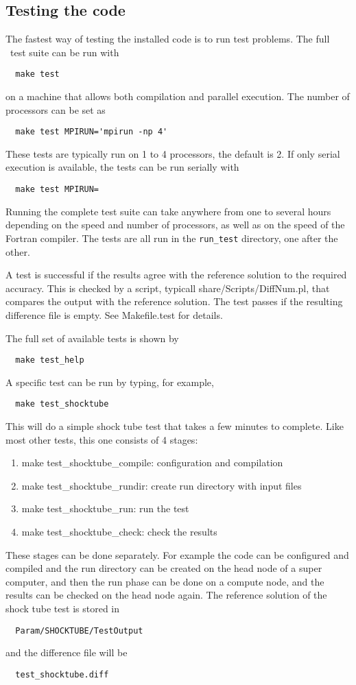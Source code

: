 \subsection{Testing the code}

The fastest way of testing the installed code is to run test problems.
The full \BATSRUS\ test suite can be run with
\begin{verbatim}
  make test
\end{verbatim}
on a machine that allows both compilation and parallel execution. 
The number of processors can be set as
\begin{verbatim}
  make test MPIRUN='mpirun -np 4'
\end{verbatim}
These tests are typically run on 1 to 4 processors, the default is 2.
If only serial execution is available, the tests can be run serially with
\begin{verbatim}
  make test MPIRUN=
\end{verbatim}
Running the complete test suite can take anywhere from one to several
hours depending on the speed and number of processors, as well as on
the speed of the Fortran compiler. The tests are all run in the 
{\tt run\_test} directory, one after the other.

A test is successful if the results agree with the reference solution
to the required accuracy. This is checked by a script, typicall
share/Scripts/DiffNum.pl, that compares the output with the reference
solution.  The test passes if the resulting difference file is empty.
See Makefile.test for details.

The full set of available tests is shown by 
\begin{verbatim}
  make test_help
\end{verbatim}
A specific test can be run by typing, for example,
\begin{verbatim}
  make test_shocktube
\end{verbatim}
This will do a simple shock tube test that takes a few minutes to complete. 
Like most other tests, this one consists of 4 stages:
\begin{enumerate}
\item make test\_shocktube\_compile: configuration and compilation
\item make test\_shocktube\_rundir:  create run directory with input files
\item make test\_shocktube\_run:     run the test
\item make test\_shocktube\_check:   check the results
\end{enumerate}
These stages can be done separately. For example the code can be configured 
and compiled and the run directory can be created on the head node of 
a super computer, and then the run phase can be done on a compute node, 
and the results can be checked on the head node again.
The reference solution of the shock tube test is stored in 
\begin{verbatim}
  Param/SHOCKTUBE/TestOutput
\end{verbatim}
and the difference file will be
\begin{verbatim}
  test_shocktube.diff
\end{verbatim}


